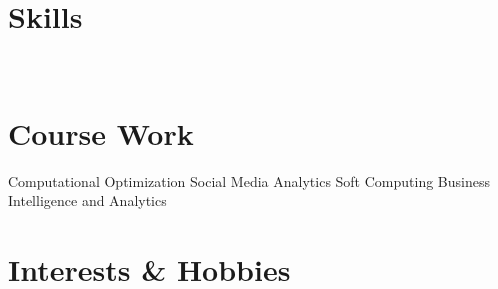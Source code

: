\documentclass[]{resume-openfont}
\begin{document}
\section{ Skills }
\begin{resumeSkillList}
\\
\end{resumeSkillList}
\sectionsep

\section{Course Work}
\begin{resumeSkillList}
{Computational Optimization Social Media Analytics Soft Computing Business Intelligence and Analytics }
\end{resumeSkillList}
\sectionsep

\section{Interests & Hobbies}
\end{document}
